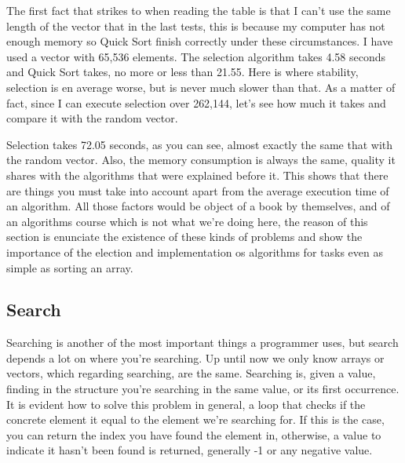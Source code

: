 \documentclass[a4paper]{article}
\begin{document}

The first fact that strikes to when reading the table is that I can't use the
same length of the vector that in the last tests, this is because my computer
has not enough memory so Quick Sort finish correctly under these circumstances.
I have used a vector with 65,536 elements. The selection algorithm takes 4.58
seconds and Quick Sort takes, no more or less than 21.55. Here is where
stability, selection is en average worse, but is never much slower than that.
As a matter of fact, since I can execute selection over 262,144, let's see how
much it takes and compare it with the random vector.

Selection takes 72.05 seconds, as you can see, almost exactly the same that
with the random vector. Also, the memory consumption is always the same, quality
it shares with the algorithms that were explained before it. This shows that
there are things you must take into account apart from the average execution
time of an algorithm. All those factors would be object of a book by themselves,
and of an algorithms course which is not what we're doing here, the reason of
this section is enunciate the existence of these kinds of problems and show the
importance of the election and implementation os algorithms for tasks even as
simple as sorting an array.

\subsection{Search}
Searching is another of the most important things a programmer uses, but search
depends a lot on where you're searching. Up until now we only know arrays or
vectors, which regarding searching, are the same. Searching is, given a value,
finding in the structure you're searching in the same value, or its first
occurrence. It is evident how to solve this problem in general, a loop that
checks if the concrete element it equal to the element we're searching for. If
this is the case, you can return the index you have found the element in,
otherwise, a value to indicate it hasn't been found is returned, generally -1
or any negative value.
\end{document}
